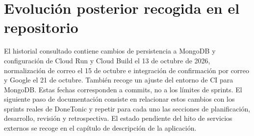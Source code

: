 \section{Evolución posterior recogida en el repositorio}
El historial consultado contiene cambios de persistencia a MongoDB y configuración de Cloud Run y Cloud Build el 13 de octubre de 2026, normalización de correo el 15 de octubre e integración de confirmación por correo y Google el 21 de octubre. También recoge un ajuste del entorno de CI para MongoDB. Estas fechas corresponden a commits, no a los límites de sprints.
El siguiente paso de documentación consiste en relacionar estos cambios con los sprints reales de DoneTonic y repetir para cada uno las secciones de planificación, desarrollo, revisión y retrospectiva. El estado pendiente del hito de servicios externos se recoge en el capítulo de descripción de la aplicación.

